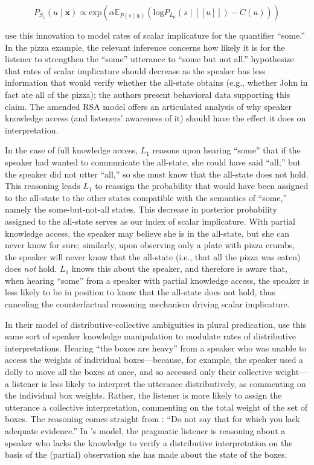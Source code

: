 \documentclass{sp}
\newcommand{\sem}[1]{\ensuremath{[\![#1]\!]}}
\begin{document}
\begin{equation} \label{S1-epistemic}
P_{S_1}(u\mid \textbf{x}) \propto \textrm{exp}(\alpha \mathbb{E}_{P(s\mid \textbf{x})}(\textrm{log}P_{L_0}(s\mid \sem{u}) - C(u)))
\end{equation}


\cite{goodmanstuhlmuller2013} use this innovation to model rates of scalar implicature for the quantifier ``some.'' In the pizza example, the relevant inference concerns how likely it is for the listener to strengthen the ``some'' utterance to ``some but not all.'' \citeauthor{goodmanstuhlmuller2013} hypothesize that rates of scalar implicature should decrease as the speaker has less information that would verify whether the all-state obtains (e.g., whether John in fact ate all of the pizza); the authors present behavioral data supporting this claim. The amended RSA model offers an articulated analysis of why speaker knowledge access (and listeners' awareness of it) should have the effect it does on interpretation. 

In the case of full knowledge access, $L_1$ reasons upon hearing ``some'' that if the speaker had wanted to communicate the all-state, she could have said ``all;'' but the speaker did not utter ``all,'' so she must know that the all-state does not hold. This reasoning leads $L_1$ to reassign the probability that would have been assigned to the all-state to the other states compatible with the semantics of ``some,'' namely the some-but-not-all states. This decrease in posterior probability assigned to the all-state serves as our index of scalar implicature. With partial knowledge access, the speaker may believe she is in the all-state, but she can never know for sure; similarly, upon observing only a plate with pizza crumbs, the speaker will never know that the all-state (i.e., that all the pizza was eaten) does \emph{not} hold. $L_1$ knows this about the speaker, and therefore is aware that, when hearing ``some'' from a speaker with partial knowledge access, the speaker is less likely to be in position to know that the all-state does not hold, thus canceling the counterfactual reasoning mechanism driving scalar implicature.

In their model of distributive-collective ambiguities in plural predication, \cite{scontrasgoodman2017} use this same sort of speaker knowledge manipulation to modulate rates of distributive interpretations. Hearing ``the boxes are heavy'' from a speaker who was unable to access the weights of individual boxes---because, for example, the speaker used a dolly to move all the boxes at once, and so accessed only their collective weight---a listener is less likely to interpret the utterance distributively, as commenting on the individual box weights. Rather, the listener is more likely to assign the utterance a collective interpretation, commenting on the total weight of the set of boxes. The reasoning comes straight from \cite{Grice1975:Logic-and-Conve}: ``Do not say that for which you lack adequate evidence.'' In \citeauthor{scontrasgoodman2017}'s model, the pragmatic listener is reasoning about a speaker who lacks the knowledge to verify a distributive interpretation on the basis of the (partial) observation she has made about the state of the boxes.
\end{document}
